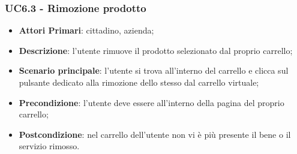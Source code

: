 \subsubsection{UC6.3 - Rimozione prodotto}
\begin{itemize}
	\item \textbf{Attori Primari}: cittadino, azienda\glo;
	\item \textbf{Descrizione}: l'utente rimuove il prodotto selezionato dal proprio carrello;
	\item \textbf{Scenario principale}: l'utente si trova all'interno del carrello e clicca sul pulsante dedicato alla rimozione dello stesso dal carrello virtuale;
	\item \textbf{Precondizione}: l'utente deve essere all'interno della pagina del proprio carrello;
	\item \textbf{Postcondizione}: nel carrello dell'utente non vi è più presente il bene o il servizio rimosso.
\end{itemize}